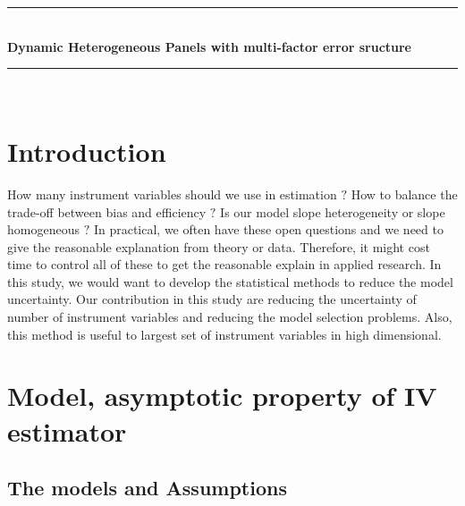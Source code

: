 \documentclass[12pt,a4paper,hyperref]{article}
\begin{document}
\begin{titlepage}

\newcommand{\HRule}{\rule{\linewidth}{0.5mm}} %

\center %



\HRule \\[0.4cm]
{ \huge \bfseries Dynamic Heterogeneous Panels with multi-factor error sructure}\\[0.4cm] %
\HRule \\[1.5cm]


\vfill %

\end{titlepage}

\newpage
\tableofcontents
\newpage
\section{Introduction}
How many instrument variables should we use in estimation $?$ How to balance the trade-off between bias and efficiency $?$   
Is our model slope heterogeneity or slope homogeneous $?$ In practical, we often have these open questions and we need to give the reasonable explanation from theory or data.
Therefore, it might cost time to control all of these to get the reasonable explain in applied research. In this study, we would want to develop the statistical  methods to reduce the model uncertainty.
Our contribution in this study are reducing the uncertainty of number of instrument variables and reducing the model selection problems. Also, this method is useful to largest set of instrument variables in high dimensional.
 





\section{Model, asymptotic property of IV estimator}
\subsection{The models and Assumptions}
\end{document}
